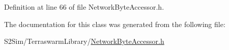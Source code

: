 Definition at line 66 of file Network\-Byte\-Accessor.\-h.



The documentation for this class was generated from the following file\-:\begin{DoxyCompactItemize}
\item 
S2\-Sim/\-Terraswarm\-Library/\hyperlink{_network_byte_accessor_8h}{Network\-Byte\-Accessor.\-h}\end{DoxyCompactItemize}
